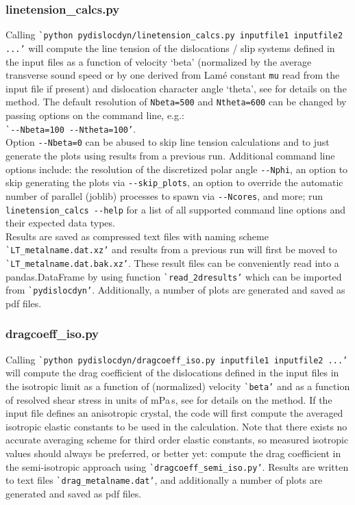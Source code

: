 \documentclass[11pt,letterpaper,oneside,pdftex]{article}
\begin{document}
\subsubsection{linetension\_calcs.py}

Calling \verb|`python pydislocdyn/linetension_calcs.py inputfile1 inputfile2 ...’| will compute the line tension of the dislocations / slip systems defined in the input files as a function of velocity ‘beta’ (normalized by the average transverse sound speed or by one derived from Lam\'e constant \verb|mu| read from the input file if present) and dislocation character angle ‘theta’, see \cite{Blaschke:2017lten} for details on the method.
The default resolution of \verb|Nbeta=500| and \verb|Ntheta=600| can be changed by passing options on the command line, e.g.:
\\\verb|`--Nbeta=100 --Ntheta=100’|.\\
Option \verb|--Nbeta=0| can be abused to skip line tension calculations and to just generate the plots using results from a previous run. 
Additional command line options include:
the resolution of the discretized polar angle \verb|--Nphi|,
an option to skip generating the plots via \verb|--skip_plots|,
an option to override the automatic number of parallel (joblib) processes to spawn via \verb|--Ncores|,
and more; run \verb|linetension_calcs --help| for a list of all supported command line options and their expected data types.
\\
Results are saved as compressed text files with naming scheme \verb|`LT_metalname.dat.xz’| and results from a previous run will first be moved to \verb|`LT_metalname.dat.bak.xz’|.
These result files can be conveniently read into a pandas.DataFrame by using function \verb|`read_2dresults’| which can be imported from \verb|`pydislocdyn’|.
Additionally, a number of plots are generated and saved as pdf files.



\subsubsection{dragcoeff\_iso.py}

Calling \verb|`python pydislocdyn/dragcoeff_iso.py inputfile1 inputfile2 ...’| will compute the drag coefficient of the dislocations defined in the input files in the isotropic limit as a function of (normalized) velocity \verb|`beta’| and as a function of resolved shear stress in units of mPa\,s, see \cite{Blaschke:BpaperRpt,Blaschke:2019Bpap,Blaschke:2019a} for details on the method.
If the input file defines an anisotropic crystal, the code will first compute the averaged isotropic elastic constants to be used in the calculation.
Note that there exists no accurate averaging scheme for third order elastic constants, so measured isotropic values should always be preferred, or better yet: compute the drag coefficient in the semi-isotropic approach using  \verb|`dragcoeff_semi_iso.py’|.
Results are written to text files \verb|`drag_metalname.dat’|, and additionally a number of plots are generated and saved as pdf files.
\end{document}
